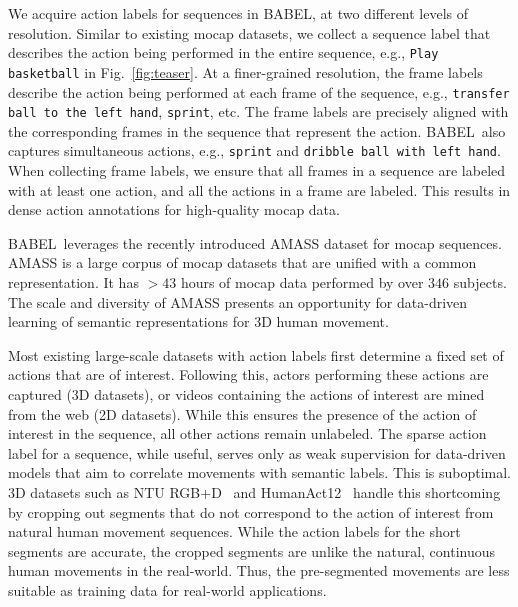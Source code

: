 \documentclass[final]{cvpr}
\def\babel{BABEL}
\def\ntu{NTU RGB+D}
\def\ha12{HumanAct12}
\begin{document}
We acquire action labels for sequences in \babel, at two different levels of resolution. 
Similar to existing mocap datasets, we collect a sequence label that describes the action being performed in the entire sequence, e.g., \texttt{Play basketball} in Fig.~\ref{fig:teaser}. 
At a finer-grained resolution, the frame labels describe the action being performed at each frame of the sequence, e.g., \texttt{transfer ball to the left hand}, \texttt{sprint}, etc. 
The frame labels are precisely aligned with the corresponding frames in the sequence that represent the action. 
\babel~also captures simultaneous actions, e.g., \texttt{sprint} and \texttt{dribble ball with left hand}. 
When collecting frame labels, we ensure that all frames in a sequence are labeled with at least one action, and all the actions in a frame are labeled. This results in dense action annotations for high-quality mocap data. 

\babel~leverages the recently introduced AMASS dataset \cite{DBLP:conf/iccv/MahmoodGTPB19} for mocap sequences. AMASS is a large corpus of mocap datasets that are unified with a common representation. 
It has $>43$ hours of mocap data performed by over $346$ subjects. 
The scale and diversity of AMASS presents an opportunity for data-driven learning of semantic representations for 3D human movement. 

Most existing large-scale datasets with action labels \cite{cmu_mocap,harvey2020robust,DBLP:journals/pami/LiuSPWDK20,DBLP:conf/icar/ManderyTDVA15,DBLP:conf/mir/SedmidubskyEZ19,DBLP:conf/cvpr/ShahroudyLNW16,DBLP:conf/iccv/Zhao0TY19,DBLP:journals/corr/abs-2004-14899} first determine a fixed set of actions that are of interest. 
Following this, actors performing these actions are captured (3D datasets), or videos containing the actions of interest are mined from the web (2D datasets). 
While this ensures the presence of the action of interest in the sequence, all other actions remain unlabeled. 
The sparse action label for a sequence, while useful, serves only as weak supervision for data-driven models that aim to correlate movements with semantic labels. This is suboptimal. 
3D datasets such as \ntu~\cite{DBLP:journals/pami/LiuSPWDK20,DBLP:conf/cvpr/ShahroudyLNW16} and \ha12~\cite{DBLP:journals/corr/abs-2004-14899} handle this shortcoming by cropping out segments that do not correspond to the action of interest from natural human movement sequences. 
While the action labels for the short segments are accurate, the cropped segments are unlike the natural, continuous human movements in the real-world. Thus, the pre-segmented movements are less suitable as training data for real-world applications. 
\end{document}
